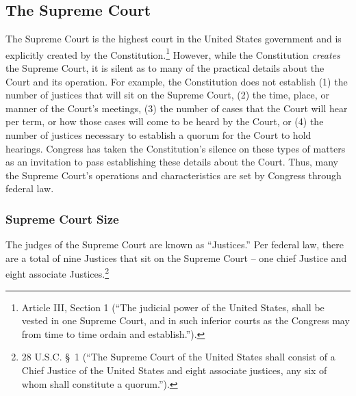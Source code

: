 \subsection{The Supreme Court}
The Supreme Court is the highest court in the United States government and is explicitly created by the Constitution.\footnote{Article III, Section 1 (``The judicial power of the United States, shall be vested in one Supreme Court, and in such inferior courts as the Congress may from time to time ordain and establish.'').}
However, while the Constitution \textit{creates} the Supreme Court, it is silent as to many of the practical details about the Court and its operation.  For example, the Constitution does not establish (1) the number of justices that will sit on the Supreme Court, (2) the time, place, or manner of the Court's meetings, (3) the number of cases that the Court will hear per term, or how those cases will come to be heard by the Court, or (4) the number of justices necessary to establish a quorum for the Court to hold hearings.  Congress has taken the Constitution's silence on these types of matters as an invitation to pass establishing these details about the Court.  Thus, many the Supreme Court's operations and characteristics are set by Congress through federal law.

\subsubsection{Supreme Court Size}

The judges of the Supreme Court are known as ``Justices.''  Per federal law, there are a total of nine Justices that sit on the Supreme Court -- one chief Justice and eight associate Justices.\footnote{28 U.S.C. \S\ 1 (``The Supreme Court of the United States shall consist of a Chief Justice of the United States and eight associate justices, any six of whom shall constitute a quorum.'').}  

